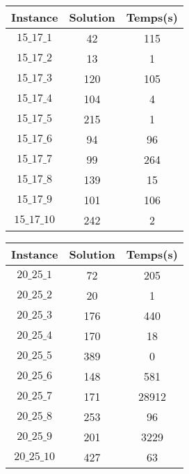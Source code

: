\documentclass[a4paper, 11pt]{article} %
\begin{document}
\begin{center}
\begin{figure}[H]
   \begin{minipage}[c]{.46\linewidth}
      \begin{tabular}{|c|c|c|}
  		\hline 
  		  Instance & Solution & Temps(s) \\ \hline
        $15\_17\_1$   & 42 &  115 \\ \hline
        $15\_17\_2$   & 13 &  1 \\ \hline
        $15\_17\_3$   & 120 & 105 \\ \hline
        $15\_17\_4$   & 104 & 4 \\ \hline
        $15\_17\_5$   & 215 & 1 \\ \hline
        $15\_17\_6$   & 94 &  96 \\ \hline
        $15\_17\_7$   & 99 &  264 \\ \hline
        $15\_17\_8$   & 139 & 15 \\ \hline
        $15\_17\_9$   & 101 & 106 \\ \hline
        $15\_17\_10$  & 242 & 2 \\ \hline
  	  \end{tabular}
   \end{minipage} \hfill
   \begin{minipage}[c]{.46\linewidth}
      \begin{tabular}{|c|c|c|}
  		\hline 
  		  Instance & Solution & Temps(s) \\ \hline
        $20\_25\_1$   & 72 &  205 \\ \hline
        $20\_25\_2$   & 20 &  1 \\ \hline
        $20\_25\_3$   & 176 & 440 \\ \hline
        $20\_25\_4$   & 170 & 18 \\ \hline
        $20\_25\_5$   & 389 & 0 \\ \hline
        $20\_25\_6$   & 148 & 581 \\ \hline
        $20\_25\_7$   & 171 & 28912 \\ \hline
        $20\_25\_8$   & 253 & 96 \\ \hline
        $20\_25\_9$   & 201 & 3229 \\ \hline
        $20\_25\_10$  & 427 & 63 \\ \hline
  	  \end{tabular}
   \end{minipage}
\end{figure}
\end{center}
\end{document}

